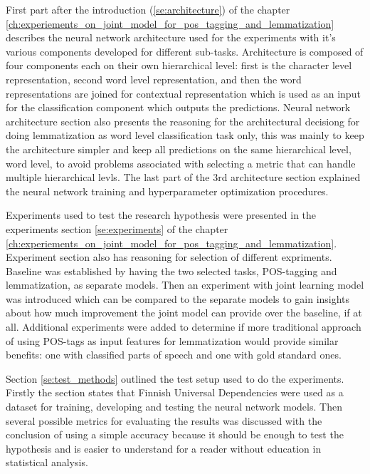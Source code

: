 \documentclass[12pt,a4paper,english
]{tutthesis}
\begin{document}
First part after the introduction (\ref{se:architecture}) of the chapter \ref{ch:experiements_on_joint_model_for_pos_tagging_and_lemmatization} describes the neural network architecture used for the experiments with it's various components developed for different sub-tasks. Architecture is composed of four components each on their own hierarchical level: first is the character level representation, second word level representation, and then the word representations are joined for contextual representation which is used as an input for the classification component which outputs the predictions. Neural network architecture section also presents the reasoning for the architectural decisiong for doing lemmatization as word level classification task only, this was mainly to keep the architecture simpler and keep all predictions on the same hierarchical level, word level, to avoid problems associated with selecting a metric that can handle multiple hierarchical levls. The last part of the 3rd architecture section explained the neural network training and hyperparameter optimization procedures.

Experiments used to test the research hypothesis were presented in the experiments section \ref{se:experiments} of the chapter \ref{ch:experiements_on_joint_model_for_pos_tagging_and_lemmatization}. Experiment section also has reasoning for selection of different expriments. Baseline was established by having the two selected tasks, POS-tagging and lemmatization, as separate models. Then an experiment with joint learning model was introduced which can be compared to the separate models to gain insights about how much improvement the joint model can provide over the baseline, if at all. Additional experiments were added to determine if more traditional approach of using POS-tags as input features for lemmatization would provide similar benefits: one with classified parts of speech and one with gold standard ones.

Section \ref{se:test_methods} outlined the test setup used to do the experiments. Firstly the section states that Finnish Universal Dependencies were used as a dataset for training, developing and testing the neural network models. Then several possible metrics for evaluating the results was discussed with the conclusion of using a simple accuracy because it should be enough to test the hypothesis and is easier to understand for a reader without education in statistical analysis.
\end{document}
